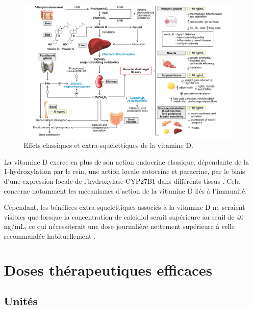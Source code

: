 \documentclass[
  a4paper,
  DIV=11,
  numbers=noendperiod,
  listof=totoc]{scrreprt}
\begin{document}
\begin{landscape}
\begin{figure}
\includegraphics{figures/extra-skeletal-effect.png} 
\caption[\textbf{Effets classiques et extra-squelettiques de la vitamine D.}]
{Effets classiques et extra-squelettiques de la vitamine D. \textcite{Caprio.2017}}
\label{fig:extra-skeletal}
\end{figure}
\end{landscape}

La vitamine D exerce en plus de son action endocrine classique,
dépendante de la 1-hydroxylation par le rein, une action locale
autocrine et paracrine, par le biais d'une expression locale de
l'hydroxylase \ac{CYP27B1} dans différents tissus
\autocite{Carmeliet.2015,Cannell.2008}. Cela concerne notamment les
mécanismes d'action de la vitamine D liés à l'immunité.

Cependant, les bénéfices extra-squelettiques associés à la vitamine D ne
seraient visibles que lorsque la concentration de calcidiol serait
supérieure au seuil de 40 ng/mL, ce qui nécessiterait une dose
journalière nettement supérieure à celle recommandée habituellement
\autocite{Caprio.2017}.

\hypertarget{doses-thuxe9rapeutiques-efficaces}{%
\section{Doses thérapeutiques
efficaces}\label{doses-thuxe9rapeutiques-efficaces}}

\hypertarget{unituxe9s}{%
\subsection{Unités}\label{unituxe9s}}
\end{document}
